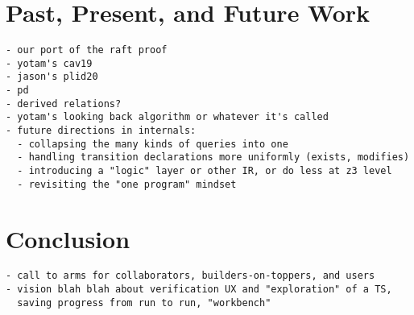 \documentclass[10pt]{article}
\begin{document}
\section*{Past, Present, and Future Work}

\begin{verbatim}
- our port of the raft proof
- yotam's cav19
- jason's plid20
- pd
- derived relations?
- yotam's looking back algorithm or whatever it's called
- future directions in internals:
  - collapsing the many kinds of queries into one
  - handling transition declarations more uniformly (exists, modifies)
  - introducing a "logic" layer or other IR, or do less at z3 level
  - revisiting the "one program" mindset
\end{verbatim}

\section*{Conclusion}

\begin{verbatim}
- call to arms for collaborators, builders-on-toppers, and users
- vision blah blah about verification UX and "exploration" of a TS,
  saving progress from run to run, "workbench"
\end{verbatim}
\end{document}
